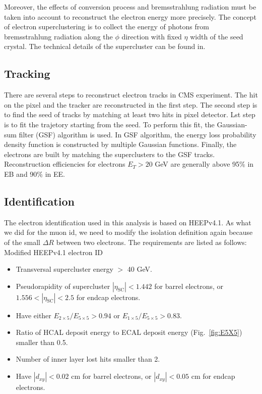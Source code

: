 Moreover, the effects of conversion process and bremsstrahlung radiation must be taken into account to reconstruct the electron energy more precisely. The concept of electron superclustering is to collect the energy of photons from bremsstrahlung radiation along the $\phi$ direction with fixed $\eta$ width of the seed crystal. The technical details of the supercluster can be found in\cite{eleSC}.

\subsection*{Tracking}
There are several steps to reconstruct electron tracks in CMS experiment. The hit on the pixel and the tracker are reconstructed in the first step. The second step is to find the seed of tracks by matching at least two hits in pixel detector. Lst step is to fit the trajetory starting from the seed. To perform this fit, the Gaussian-sum filter (GSF) algorithm is used\cite{GSF}. In GSF algorithm, the energy loss probability density function is constructed by multiple Gaussian functions. Finally, the electrons are built by matching the superclusters to the GSF tracks. Reconstruction efficiencies for electrons $E_{T} > 20$ GeV are generally above 95\% in EB and 90\% in EE\cite{eleRecoEff}.

\subsection*{Identification}
The electron identification used in this analysis is based on HEEPv4.1\cite{HEEP}. As what we did for the muon id, we need to modify the isolation definition again because of the small $\Delta R$ between two electrons. The requirements are listed as follows:\\

Modified HEEPv4.1 electron ID
\begin{itemize}
\item Transversal supercluster energy $>$ 40 GeV.
\item Pseudorapidity of supercluster $|\eta_\mathrm{SC}| < 1.442$ for barrel electrons, or $1.556 < |\eta_{\mathrm{SC}}| < 2.5$ for endcap electrons.
\item Have either $E_{2\times 5}/E_{5\times 5} > 0.94$ or $E_{1\times 5}/E_{5\times 5} > 0.83$.
\item Ratio of HCAL deposit energy to ECAL deposit energy (Fig.~\ref{fig:E5X5}) smaller than 0.5.
\item Number of inner layer lost hits smaller than 2.
\item Have $|d_{xy}| < 0.02$ cm for barrel electrons, or $|d_{xy}| < 0.05$ cm for endcap electrons.\\
\end{itemize}

